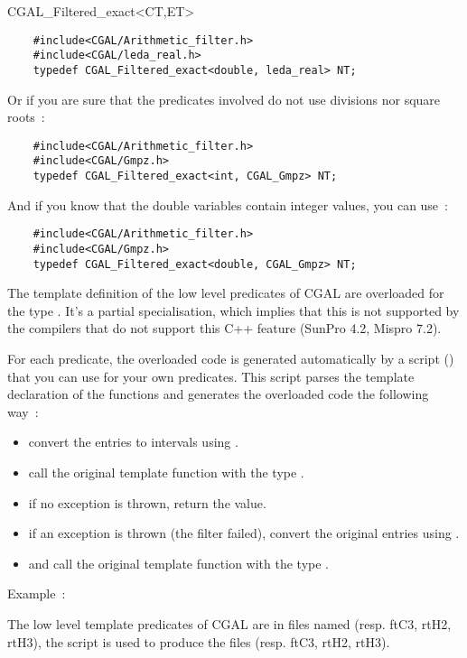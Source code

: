 \begin{ccClass} {CGAL_Filtered_exact<CT,ET>}
\begin{verbatim}
    #include<CGAL/Arithmetic_filter.h>
    #include<CGAL/leda_real.h>
    typedef CGAL_Filtered_exact<double, leda_real> NT;
\end{verbatim}

Or if you are sure that the predicates involved do not use divisions nor
square roots~:

\begin{verbatim}
    #include<CGAL/Arithmetic_filter.h>
    #include<CGAL/Gmpz.h>
    typedef CGAL_Filtered_exact<int, CGAL_Gmpz> NT;
\end{verbatim}

And if you know that the double variables contain integer values, you can
use~:

\begin{verbatim}
    #include<CGAL/Arithmetic_filter.h>
    #include<CGAL/Gmpz.h>
    typedef CGAL_Filtered_exact<double, CGAL_Gmpz> NT;
\end{verbatim}

\ccImplementation

The template definition of the low level predicates of CGAL are overloaded for
the type .  It's a partial specialisation,
which implies that this is not supported by the compilers that do not support
this C++ feature (SunPro 4.2, Mispro 7.2).

For each predicate, the overloaded code is generated automatically by a script
() that you can
use for your own predicates.  This script parses the template declaration of
the functions and generates the overloaded code the following way~:
\begin{itemize}
\item convert the entries to intervals using
    .
\item call the original template function with the type
    .
\item if no exception is thrown, return the value.
\item if an exception is thrown (the filter failed), convert the original
    entries using .
\item and call the original template function with the type .
\end{itemize}

Example~:

The low level template predicates of CGAL are in files named
 (resp. ftC3, rtH2, rtH3), the script is used
to produce the files  (resp.
ftC3, rtH2, rtH3).

\end{ccClass}
